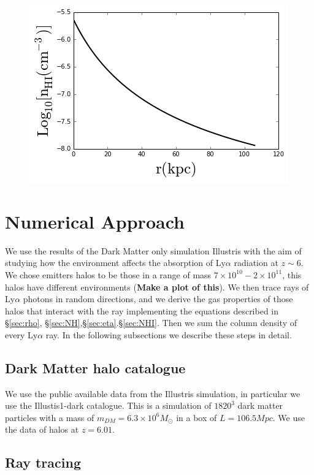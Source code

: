 \documentclass[12pt]{article}
\begin{document}
\begin{figure}[H]\label{fig:nhivsr}
\centering
\includegraphics[scale=0.7]{../figures/nhivsr.png}
\end{figure}  


\section{Numerical Approach}

We use the results of the Dark Matter only simulation Illustris with the aim
of studying how the environment affects the absorption of
Ly$\alpha$ radiation at $z\sim6$. We chose emitters halos to be 
those in a range of mass  $7 \times 10^{10} - 2 \times 10^{11}$, this 
halos have different environments (\textbf{Make a plot of this}).
We then trace rays of Ly$\alpha$ photons in random directions, and we derive
the gas properties of those halos that interact with the ray 
implementing the equations described in \S \ref{sec:rho}, 
\S \ref{sec:NH},\S \ref{sec:eta}.\S \ref{sec:NHI}. Then we sum the column 
density of every Ly$\alpha$ ray. In the following subsections we describe 
these steps in detail.  

\subsection{Dark Matter halo catalogue}

We use the public available data from the Illustris simulation, in particular we use 
the Illustis1-dark catalogue. This is a simulation of $1820^3$ dark matter particles
with a mass of $m_{DM}=6.3 \times 10^6 M_{\odot}$ in a box of $L=106.5 Mpc$. We use 
the data of halos at $z = 6.01$.

\subsection{Ray tracing}
\end{document}
